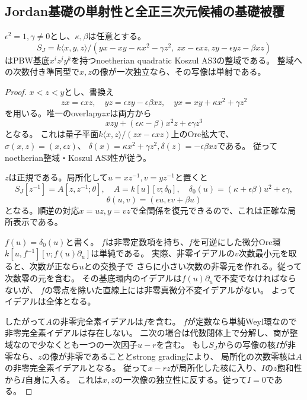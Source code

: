 \subsection{Jordan基礎の単射性と全正三次元候補の基礎被覆}
\label{subsec:h3-positive3-Jordan-base}
\begin{proposition}\label{prop:h3-positive3-Jordan-base-injective}
$\epsilon^2=1,\gamma\ne0$とし、$\kappa,\beta$は任意とする。
\[
 S_J=k\langle x,y,z\rangle/
 (yx-xy-\kappa x^2-\gamma z^2,\ zx-\epsilon xz,
 zy-\epsilon yz-\beta xz)
\]
はPBW基底$x^iz^jy^k$を持つnoetherian quadratic Koszul AS3の整域である。
整域への次数付き準同型で$x,z$の像が一次独立なら、その写像は単射である。
\end{proposition}
\begin{proof}
$x<z<y$とし、書換え
\[
 zx=\epsilon xz,\quad yz=\epsilon zy-\epsilon\beta xz,\quad
 yx=xy+\kappa x^2+\gamma z^2
\]
を用いる。唯一のoverlap$yzx$は両方から
\[
 xzy+(\epsilon\kappa-\beta)x^2z+\epsilon\gamma z^3
\]
となる。
これは量子平面$k\langle x,z\rangle/(zx-\epsilon xz)$上のOre拡大で、
$\sigma(x,z)=(x,\epsilon z)$、
$\delta(x)=\kappa x^2+\gamma z^2,\delta(z)=-\epsilon\beta xz$である。
従ってnoetherian整域・Koszul AS3性が従う。

$z$は正規である。局所化して$u=xz^{-1},v=yz^{-1}$と置くと
\[
 S_J[z^{-1}]=A[z,z^{-1};\theta],\quad
 A=k[u][v;\delta_0],\quad
 \delta_0(u)=(\kappa+\epsilon\beta)u^2+\epsilon\gamma,
\]
\[
 \theta(u,v)=(\epsilon u,\epsilon v+\beta u)
\]
となる。順逆の対応$x=uz,y=vz$で全関係を復元できるので、これは正確な局所表示である。

$f(u)=\delta_0(u)$と書く。
$f$は非零定数項を持ち、$f$を可逆にした微分Ore環
$k[u,f^{-1}][v;f(u)\partial_u]$は単純である。
実際、非零イデアルの$v$次数最小元を取ると、次数が正なら$u$との交換子で
さらに小さい次数の非零元を作れる。従って次数零の元を含む。
その基底環内のイデアルは$f(u)\partial_u$で不変でなければならないが、
$f$の零点を除いた直線上には非零真微分不変イデアルがない。
よってイデアルは全体となる。

したがって$A$の非零完全素イデアルは$f$を含む。
$f$が定数なら単純Weyl環なので非零完全素イデアルは存在しない。
二次の場合は代数閉体上で分解し、商が整域なので少なくとも一つの一次因子$u-r$を含む。
もし$S_J$からの写像の核$I$が非零なら、$z$の像が非零であることとstrong gradingにより、
局所化の次数零核は$A$の非零完全素イデアルとなる。
従って$x-rz$が局所化した核に入り、$I$の$z$飽和性から$I$自身に入る。
これは$x,z$の一次像の独立性に反する。従って$I=0$である。
\end{proof}

